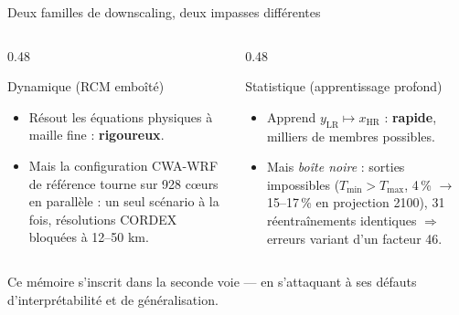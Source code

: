 \documentclass[aspectratio=169,10pt]{beamer}
\newcommand{\LR}{\mathrm{LR}}
\newcommand{\HR}{\mathrm{HR}}
\newcommand{\xHR}{x_{\HR}}
\newcommand{\yLR}{y_{\LR}}
\newcommand{\tgood}[1]{\textcolor{green!40!black}{\textbf{#1}}}
\begin{document}
\begin{frame}{Deux familles de downscaling, deux impasses différentes}
  \begin{columns}[T]
    \begin{column}{0.48\textwidth}
      \begin{block}{Dynamique (RCM emboîté)}
        \small
        \begin{itemize}
          \item Résout les équations physiques à maille fine : \tgood{rigoureux}.
          \item Mais la configuration CWA-WRF de référence tourne sur
                \alert{928 c\oe{}urs en parallèle} : un seul scénario à la fois,
                résolutions CORDEX bloquées à 12--50 km.
        \end{itemize}
      \end{block}
    \end{column}
    \begin{column}{0.48\textwidth}
      \begin{block}{Statistique (apprentissage profond)}
        \small
        \begin{itemize}
          \item Apprend $\yLR \mapsto \xHR$ : \tgood{rapide}, milliers de membres possibles.
          \item Mais \emph{boîte noire} : sorties impossibles ($T_{\min}>T_{\max}$,
                4\,\% $\to$ 15--17\,\% en projection 2100), 31 réentraînements identiques
                $\Rightarrow$ erreurs variant d'un \alert{facteur 46}.
        \end{itemize}
      \end{block}
    \end{column}
  \end{columns}
  \vspace{0.25cm}
  \centering
  \small Ce mémoire s'inscrit dans la seconde voie --- \alert{en s'attaquant à ses défauts
  d'interprétabilité et de généralisation}.
\end{frame}
\end{document}
